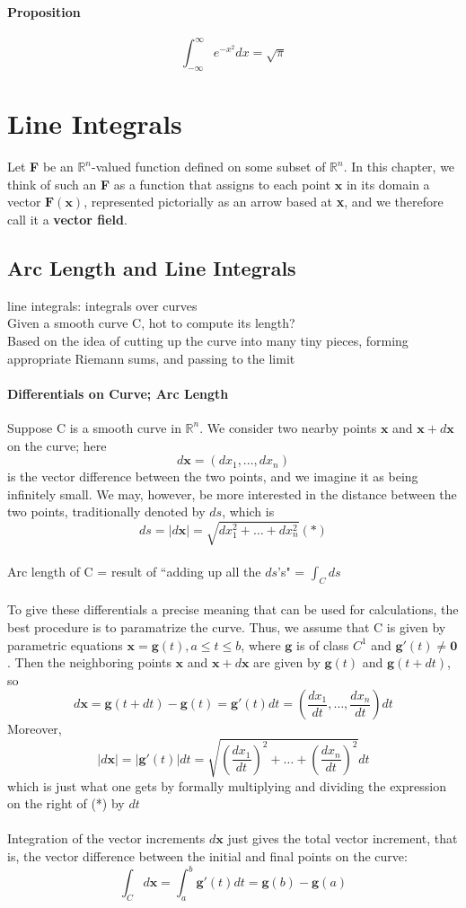 \documentclass[11pt]{article}
\newcommand{\tb}[1]{\textbf{#1}}
\newcommand{\real}[0]{\mathbb{R}}
\newcommand{\vx}[0]{\tb{x}}
\newcommand{\vo}[0]{\tb{0}}
\begin{document}
\paragraph{Proposition} $$\int_{-\infty}^\infty e^{-x^2}dx = \sqrt{\pi}$$
\section{Line Integrals}
Let \tb{F} be an $\real^n$-valued function defined on some subset of $\real^n$. In this chapter, we think of such an \tb{F} as a function that assigns to each point $\vx$ in its domain a vector $\tb{F}(\vx)$, represented pictorially as an arrow based at \vx, and we therefore call it a \tb{vector field}.
\subsection{Arc Length and Line Integrals}
line integrals: integrals over curves\\
Given a smooth curve C, hot to compute its length? \\
Based on the idea of cutting up the curve into many tiny pieces, forming appropriate Riemann sums, and passing to the limit
\paragraph{Differentials on Curve; Arc Length} Suppose C is a smooth curve in $\real^n$. We consider two nearby points $\vx$ and $\vx + d\vx$ on the curve; here
$$d\vx = (dx_1,\hdots,dx_n)$$
is the vector difference between the two points, and we imagine it as being infinitely small. We may, however, be more interested in the distance between the two points, traditionally denoted by $ds$, which is $$ds = |d\vx| = \sqrt{dx^2_1+\hdots+dx^2_n}(*)$$\\
Arc length of C = result of ``adding up all the $ds$'s" = $\int_Cds$\\\\
To give these differentials a precise meaning that can be used for calculations, the best procedure is to paramatrize the curve. Thus, we assume that C is given by parametric equations $\vx = \tb{g}(t), a\leq t \leq b$, where $\tb{g}$ is of class $C^1$ and $\tb{g}'(t) \neq \vo$. Then the neighboring points $\vx$ and $\vx + d\vx$ are given by $\tb{g}(t)$ and $\tb{g}(t+dt)$, so $$d\vx = \tb{g}(t+dt) - \tb{g}(t) = \tb{g}'(t)dt = (\frac{dx_1}{dt},\hdots,\frac{dx_n}{dt})dt$$ Moreover,
$$|d\vx| = |\tb{g}'(t)|dt = \sqrt{(\frac{dx_1}{dt})^2+ \hdots + (\frac{dx_n}{dt})^2}dt$$which is just what one gets by formally multiplying and dividing the expression on the right of (*) by $dt$\\\\
Integration of the vector increments $d\vx$ just gives the total vector increment, that is, the vector difference between the initial and final points on the curve:
$$\int_C d\vx = \int_a^b \tb{g}'(t)dt = \tb{g}(b)-\tb{g}(a)$$
\end{document}

